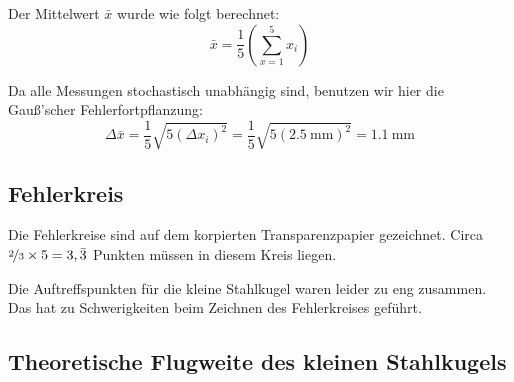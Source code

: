 \documentclass[twoside]{article}
\begin{document}
        Der Mittelwert $\bar{x}$ wurde wie folgt berechnet:
        \begin{equation}
            \bar{x} = \frac{1}{5} \left(\sum_{x=1}^{5} x_i \right) \label{eqn:mittelwert}
        \end{equation}

        Da alle Messungen stochastisch unabhängig sind, benutzen wir hier die Gauß'scher Fehlerfortpflanzung:
        \begin{equation}
            \Delta \bar{x} = \frac{1}{5} \sqrt{5 \left(\Delta x_i\right)^2} = \frac{1}{5} \sqrt{5 \left(\SI{2.5}{\milli\meter}\right)^2} = \SI{1.1}{\milli\meter}
        \end{equation}

    \subsection{Fehlerkreis}
        Die Fehlerkreise sind auf dem korpierten Transparenzpapier gezeichnet. Circa $\nicefrac{2}{3} \times 5 = 3,\bar{3}$ Punkten müssen in diesem Kreis liegen.

        Die Auftreffspunkten für die kleine Stahlkugel waren leider zu eng zusammen. Das hat zu Schwerigkeiten beim Zeichnen des Fehlerkreises geführt. 

    \subsection{Theoretische Flugweite des kleinen Stahlkugels}
        \newcommand{\sth}[0]{s_{\text{th}}}
        \newcommand{\sexp}[0]{s_{\text{exp}}}
\end{document}
